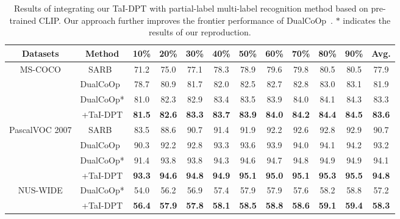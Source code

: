\documentclass[10pt,twocolumn,letterpaper]{article}
\begin{document}
\begin{table*} [!ht]
  \centering
  \caption{Results of integrating our TaI-DPT with partial-label multi-label recognition method based on pre-trained CLIP. Our approach further improves the frontier performance of DualCoOp~\cite{dualcoop}. $*$ indicates the results of our reproduction.}
  \vspace{-2mm}
  \setlength{\tabcolsep}{2.3mm}
  \begin{tabular}{c|c|ccccccccc|c}
    \toprule
    Datasets & Method & 10\% &20\% & 30\% & 40\% & 50\% & 60\% & 70\% & 80\% & 90\% & Avg. \\
    \midrule
\multirow{4}{*}{MS-COCO} & SARB~\cite{pu2022semantic} & 71.2 & 75.0 & 77.1 & 78.3 & 78.9 & 79.6 & 79.8 & 80.5 & 80.5 & 77.9\\
    & DualCoOp~\cite{dualcoop} & 78.7 & 80.9 & 81.7 & 82.0 & 82.5 & 82.7 & 82.8 & 83.0 & 83.1 & 81.9\\  
& DualCoOp* & 81.0 & 82.3 & 82.9 & 83.4 & 83.5 & 83.9 & 84.0 & 84.1 & 84.3 & 83.3\\
    & +TaI-DPT & \textbf{81.5} & \textbf{82.6} & \textbf{83.3} & \textbf{83.7} & \textbf{83.9} & \textbf{84.0} & \textbf{84.2} & \textbf{84.4} & \textbf{84.5} & \textbf{83.6}\\ 
    
\hline
    \multirow{4}{*}{PascalVOC 2007} & SARB~\cite{pu2022semantic} & 83.5 & 88.6 & 90.7 & 91.4 & 91.9 & 92.2 & 92.6 & 92.8 & 92.9 & 90.7 \\
    & DualCoOp~\cite{dualcoop} & 90.3 & 92.2 & 92.8 & 93.3 & 93.6 & 93.9 & 94.0 & 94.1 & 94.2 & 93.2\\  
& DualCoOp* & 91.4 & 93.8 & 93.8 & 94.3 & 94.6 & 94.7 & 94.8 & 94.9 & 94.9 & 94.1\\  
    & +TaI-DPT & \textbf{93.3} & \textbf{94.6} & \textbf{94.8} & \textbf{94.9} & \textbf{95.1} & \textbf{95.0} & \textbf{95.1} & \textbf{95.3} & \textbf{95.5} & \textbf{94.8}\\
    
    \hline
    \multirow{2}{*}{NUS-WIDE} & DualCoOp* & 54.0 & 56.2 & 56.9 & 57.4 & 57.9 & 57.9 & 57.6 & 58.2 & 58.8 & 57.2\\  
    & +TaI-DPT & \textbf{56.4} & \textbf{57.9} & \textbf{57.8} & \textbf{58.1} & \textbf{58.5} & \textbf{58.8} & \textbf{58.6} & \textbf{59.1} & \textbf{59.4} & \textbf{58.3}\\

    \bottomrule
  \end{tabular}\vspace{-3mm}
  \label{tab:partial}
\end{table*}
\end{document}
